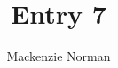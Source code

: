 \documentclass{article}
\title{Entry 7}
\author{Mackenzie Norman}
\begin{document}
\maketitle
\paragraph{}
\end{document}
